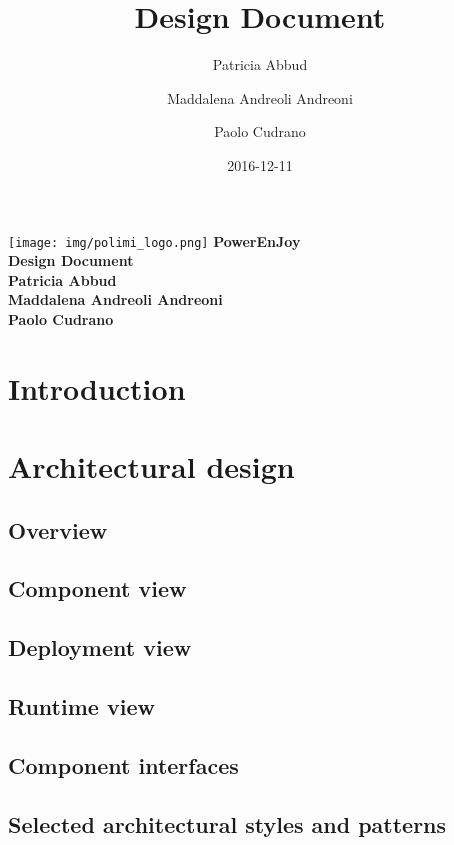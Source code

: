 \documentclass[12pt, a4paper]{article}
\title{Design Document}
\date{2016-12-11}
\author{
	Patricia Abbud
	\and
	Maddalena Andreoli Andreoni
	\and
	Paolo Cudrano
}
\begin{document}
	\begin{titlepage}
		\centering
		\texttt{[image: img/polimi\_logo.png]} %
		\vfill
		{\bfseries\Large
			PowerEnJoy\\
			Design Document\\
			\vskip4cm
			Patricia Abbud\\
			Maddalena Andreoli Andreoni\\
			Paolo Cudrano\\
		}
		\vfill
		\vfill
	\end{titlepage}

	\tableofcontents
	\newpage

	\section{Introduction}
		

	\newpage
	\section{Architectural design}
		\subsection{Overview}
			

		\subsection{Component view}
			

		\subsection{Deployment view}
			

		\subsection{Runtime view}
			

		\subsection{Component interfaces}
		\label{sec:components_interfaces}
			

		\subsection{Selected  architectural  styles  and  patterns}
			
\end{document}
